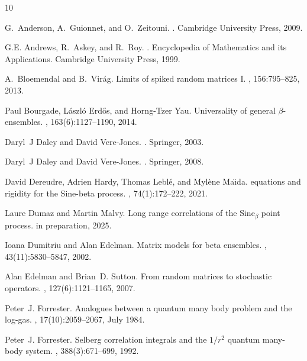\documentclass[12pt]{article}
\theoremstyle{definition} %
\theoremstyle{remark} %
\begin{document}
\def\cprime{$'$}
\begin{thebibliography}{10}

G.~Anderson, A.~Guionnet, and O.~Zeitouni.
.
\newblock Cambridge University Press, 2009.

G.E. Andrews, R.~Askey, and R.~Roy.
.
\newblock Encyclopedia of Mathematics and its Applications. Cambridge
  University Press, 1999.

A.~Bloemendal and B.~Vir{\'a}g.
\newblock Limits of spiked random matrices {I}.
, 156:795--825, 2013.

Paul Bourgade, L{{\'a}}szl{{\'o}} Erd{\H{o}}s, and Horng-Tzer Yau.
\newblock Universality of general {$\beta$}-ensembles.
, 163(6):1127--1190, 2014.

Daryl~J Daley and David Vere-Jones.
.
\newblock Springer, 2003.

Daryl~J Daley and David Vere-Jones.
.
\newblock Springer, 2008.

David Dereudre, Adrien Hardy, Thomas Lebl{\'e}, and Myl{\`e}ne Ma{\"\i}da.
 equations and rigidity for the {S}ine-beta process.
, 74(1):172--222,
  2021.

Laure Dumaz and Martin Malvy.
\newblock Long range correlations of the {S}ine$_\beta$ point process.
\newblock in preparation, 2025.

Ioana Dumitriu and Alan Edelman.
\newblock Matrix models for beta ensembles.
, 43(11):5830--5847, 2002.

Alan Edelman and Brian~D. Sutton.
\newblock From random matrices to stochastic operators.
, 127(6):1121--1165, 2007.

Peter~J. Forrester.
\newblock Analogues between a quantum many body problem and the log-gas.
,
  17(10):2059--2067, July 1984.

Peter~J. Forrester.
\newblock Selberg correlation integrals and the $1/r^2$ quantum many-body
  system.
, 388(3):671--699, 1992.


\end{thebibliography}
\end{document}
